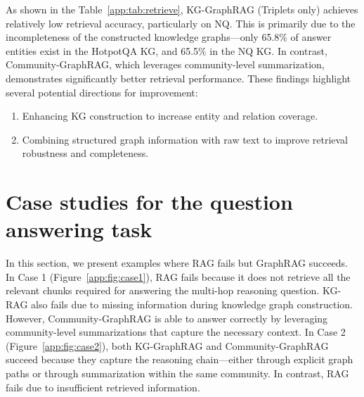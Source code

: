 As shown in the Table~\ref{app:tab:retrieve}, KG-GraphRAG (Triplets only) achieves relatively low retrieval accuracy, particularly on NQ. This is primarily due to the incompleteness of the constructed knowledge graphs—only 65.8\% of answer entities exist in the HotpotQA KG, and 65.5\% in the NQ KG. In contrast, Community-GraphRAG, which leverages community-level summarization, demonstrates significantly better retrieval performance.
These findings highlight several potential directions for improvement:
\begin{enumerate}[leftmargin=1em]
\item Enhancing KG construction to increase entity and relation coverage.
\item Combining structured graph information with raw text to improve retrieval robustness and completeness.
\end{enumerate}



\section{Case studies for the question answering task}
\label{app:sec:case}

In this section, we present examples where RAG fails but GraphRAG succeeds. In Case 1 (Figure~\ref{app:fig:case1}), RAG fails because it does not retrieve all the relevant chunks required for answering the multi-hop reasoning question. KG-RAG also fails due to missing information during knowledge graph construction. However, Community-GraphRAG is able to answer correctly by leveraging community-level summarizations that capture the necessary context. In Case 2 (Figure~\ref{app:fig:case2}), both KG-GraphRAG and Community-GraphRAG succeed because they capture the reasoning chain—either through explicit graph paths or through summarization within the same community. In contrast, RAG fails due to insufficient retrieved information.



